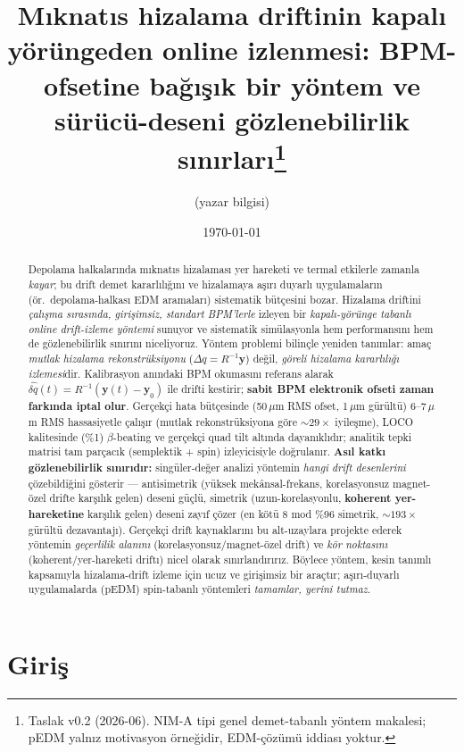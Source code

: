 \documentclass[twocolumn,a4paper,10pt]{article}
\title{\bfseries Mıknatıs hizalama driftinin kapalı yörüngeden online
izlenmesi: BPM-ofsetine bağışık bir yöntem ve sürücü-deseni gözlenebilirlik
sınırları\thanks{Taslak v0.2 (2026-06). NIM-A tipi genel demet-tabanlı yöntem
makalesi; pEDM yalnız motivasyon örneğidir, EDM-çözümü iddiası yoktur.}}
\author{(yazar bilgisi)}
\date{\today}
\begin{document}
\maketitle

\begin{abstract}
\noindent
Depolama halkalarında mıknatıs hizalaması yer hareketi ve termal etkilerle
zamanla \emph{kayar}; bu drift demet kararlılığını ve hizalamaya aşırı duyarlı
uygulamaların (ör.\ depolama-halkası EDM aramaları) sistematik bütçesini bozar.
Hizalama driftini \emph{çalışma sırasında, girişimsiz, standart BPM'lerle} izleyen
bir \emph{kapalı-yörünge tabanlı online drift-izleme yöntemi} sunuyor ve
sistematik simülasyonla hem performansını hem de gözlenebilirlik sınırını
niceliyoruz. Yöntem problemi bilinçle yeniden tanımlar: amaç \emph{mutlak hizalama
rekonstrüksiyonu} ($\Delta q = R^{-1}\mathbf{y}$) değil, \emph{göreli hizalama
kararlılığı izlemesi}dir. Kalibrasyon anındaki BPM okumasını referans alarak
$\widehat{\delta q}(t) = R^{-1}(\mathbf{y}(t)-\mathbf{y}_0)$ ile drifti kestirir;
\textbf{sabit BPM elektronik ofseti zaman farkında iptal olur}. Gerçekçi hata
bütçesinde (50\,$\mu$m RMS ofset, 1\,$\mu$m gürültü) 6--7\,$\mu$m RMS hassasiyetle
çalışır (mutlak rekonstrüksiyona göre $\sim 29\times$ iyileşme), LOCO kalitesinde
(\%1) $\beta$-beating ve gerçekçi quad tilt altında dayanıklıdır; analitik tepki
matrisi tam parçacık (semplektik + spin) izleyicisiyle doğrulanır. \textbf{Asıl
katkı gözlenebilirlik sınırıdır:} singüler-değer analizi yöntemin \emph{hangi
drift desenlerini} çözebildiğini gösterir --- antisimetrik (yüksek mekânsal-frekans,
korelasyonsuz magnet-özel drifte karşılık gelen) deseni güçlü, simetrik
(uzun-korelasyonlu, \textbf{koherent yer-hareketine} karşılık gelen) deseni zayıf
çözer (en kötü 8 mod \%96 simetrik, $\sim 193\times$ gürültü dezavantajı). Gerçekçi
drift kaynaklarını bu alt-uzaylara projekte ederek yöntemin \emph{geçerlilik
alanını} (korelasyonsuz/magnet-özel drift) ve \emph{kör noktasını}
(koherent/yer-hareketi driftı) nicel olarak sınırlandırırız. Böylece yöntem, kesin
tanımlı kapsamıyla hizalama-drift izleme için ucuz ve girişimsiz bir araçtır;
aşırı-duyarlı uygulamalarda (pEDM) spin-tabanlı yöntemleri \emph{tamamlar, yerini
tutmaz}.
\end{abstract}

\section{Giriş}
\end{document}
